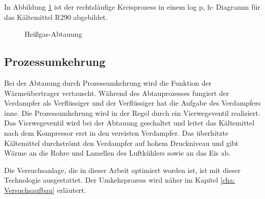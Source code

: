 In Abbildung \ref{fig:Heissgas-Abtauung} ist der rechtsläufige Kreisprozess in einem log p, h- Diagramm für das Kältemittel R290 abgebildet. 


\begin{figure}[htb]
\centering
{}
\caption{Heißgas-Abtauung \citep{Kosowski2009}}
\label{fig:Heissgas-Abtauung}
\end{figure}



\subsection*{Prozessumkehrung}

Bei der Abtauung durch Prozessumkehrung wird die Funktion der Wärmeübertrager vertauscht. Während des Abtauprozesses fungiert der Verdampfer als Verflüssiger und der Verflüssiger hat die Aufgabe des Verdampfers inne. Die Prozessumkehrung wird in der Regel durch ein Vierwegeventil realisiert. Das Vierwegeventil wird bei der Abtauung geschaltet und leitet das Kältemittel nach dem Kompressor erst in den vereisten Verdampfer. Das überhitzte Kältemittel durchströmt den Verdampfer auf hohem Druckniveau und gibt Wärme an die Rohre und Lamellen des Luftkühlers sowie an das Eis ab.

Die Versuchsanlage, die in dieser Arbeit optimiert worden ist, ist mit dieser Technologie ausgestattet. Der Umkehrprozess wird näher im Kapitel \ref{cha: Versuchsaufbau} erläutert. 


